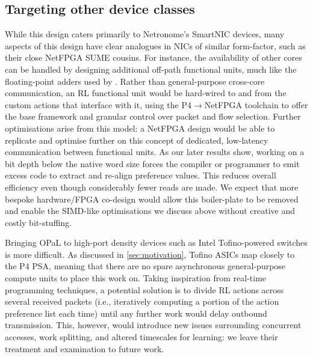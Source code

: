 \documentclass[sigconf,natbib=false]{acmart}
\newcommand{\approachshort}{OPaL}
\begin{document}
\subsection{Targeting other device classes}
While this design caters primarily to Netronome's SmartNIC devices, many aspects of this design have clear analogues in NICs of similar form-factor, such as their close NetFPGA SUME cousins.
For instance, the availability of other cores can be handled by designing additional off-path functional units, much like the floating-point adders used by \textcite{DBLP:conf/isca/LiLYCSH19}.
Rather than general-purpose cross-core communication, an RL functional unit would be hard-wired to and from the custom actions that interface with it, using the P4$\rightarrow$NetFPGA toolchain to offer the base framework and granular control over packet and flow selection.
Further optimisations arise from this model: a NetFPGA design would be able to replicate and optimise further on this concept of dedicated, low-latency communication between functional units.
As our later results show, working on a bit depth below the native word size forces the compiler or programmer to emit excess code to extract and re-align preference values.
This reduces overall efficiency even though considerably fewer reads are made.
We expect that more bespoke hardware/FPGA co-design would allow this boiler-plate to be removed and enable the SIMD-like optimisations we discuss above without creative and costly bit-stuffing.

Bringing \approachshort{} to high-port density devices such as Intel Tofino-powered switches is more difficult.
As discussed in \cref{sec:motivation}, Tofino ASICs map closely to the P4 PSA, meaning that there are no spare asynchronous general-purpose compute units to place this work on.
Taking inspiration from real-time programming techniques, a potential solution is to divide RL actions across several received packets (i.e., iteratively computing a portion of the action preference list each time) until any further work would delay outbound transmission.
This, however, would introduce new issues surrounding concurrent accesses, work splitting, and altered timescales for learning: we leave their treatment and examination to future work.
\end{document}
